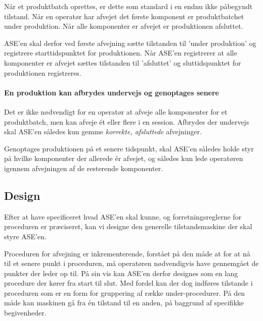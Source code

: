 \documentclass[a4paper]{article}
\begin{document}
Når et produktbatch oprettes, er dette som standard i en endnu ikke påbegyndt tilstand. Når en operatør har afvejet det første komponent er produktbatchet under produktion. Når alle komponenter er afvejet er produktionen afsluttet.

ASE'en skal derfor ved første afvejning sætte tilstanden til 'under produktion' og registrere starttidspunktet for produktionen. Når ASE'en registrerer at alle komponenter er afvejet sættes tilstanden til 'afsluttet' og sluttidspunktet for produktionen registreres.


\paragraph{En produktion kan afbrydes undervejs og genoptages senere} %

Det er ikke nødvendigt for en operatør at afveje alle komponenter for et produktbatch, men kan afveje ét eller flere i en session. Afbrydes der undervejs skal ASE'en således kun gemme \emph{korrekte, afsluttede} afvejninger.

Genoptages produktionen på et senere tidspunkt, skal ASE'en således holde styr på hvilke komponenter der allerede ér afvejet, og således kun lede operatøren igennem afvejningen af de resterende komponenter.



\subsection{Design} %

Efter at have specificeret hvad ASE'en skal kunne, og forretningsreglerne for proceduren er præciseret, kan vi designe den generelle tilstandsmaskine der skal styre ASE'en.

Proceduren for afvejning er inkrementerende, forstået på den måde at for at nå til et senere punkt i proceduren, må operatøren nødvendigvis have gennemgået de punkter der leder op til. På sin vis kan ASE'en derfor designes som en lang procedure der kører fra start til slut. Med fordel kan der dog indføres tilstande i proceduren som er en form for gruppering af række under-procedurer. På den måde kan maskinen gå fra én tilstand til en anden, på baggrund af specifikke begivenheder.
\end{document}
